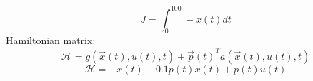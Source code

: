 $$J = \int_0^{100}-x(t)dt$$
Hamiltonian matrix:
$$\mathcal{H} =  g(\vec x(t), u(t), t) + {\vec{p}(t)}^Ta(\vec x(t), u(t), t)$$
$$\mathcal{H} = -x(t) -0.1p(t)x(t)+p(t)u(t)$$


